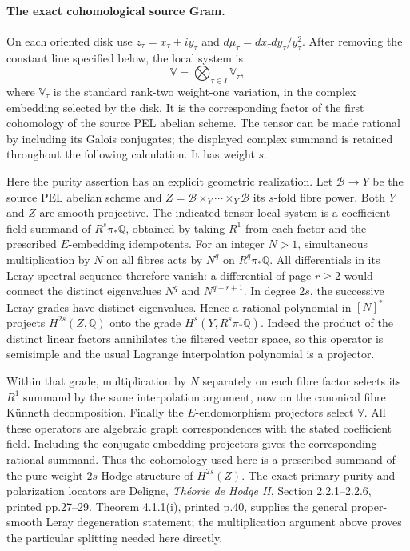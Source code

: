 \documentclass[11pt]{article}
\newcommand{\Q}{\mathbb Q}\newcommand{\C}{\mathbb C}\newcommand{\Z}{\mathbb Z}\newcommand{\R}{\mathbb R}\newcommand{\A}{\mathbb A}\newcommand{\OO}{\mathcal O}
\theoremstyle{definition}\newtheorem{definition}[theorem]{Definition}\newtheorem{remark}[theorem]{Remark}
\begin{document}
\paragraph{The exact cohomological source Gram.}
On each oriented disk use $z_\tau=x_\tau+iy_\tau$ and
$d\mu_\tau=dx_\tau dy_\tau/y_\tau^2$.  After removing the
constant line specified below, the local system is
\[
                     \mathbb V=
               \bigotimes_{\tau\in I}\mathbb V_\tau,
 \tag{B26i}
\]
where $\mathbb V_\tau$ is the standard rank-two weight-one
variation, in the complex embedding selected by the disk.
It is the corresponding factor of the first cohomology of
the source PEL abelian scheme.  The tensor can be made rational
by including its Galois conjugates; the displayed complex
summand is retained throughout the following calculation.
It has weight $s$.

Here the purity assertion has an explicit geometric
realization.  Let $\mathcal B\to Y$ be the source PEL
abelian scheme and $Z=\mathcal B\times_Y\cdots\times_Y
\mathcal B$ its $s$-fold fibre power.  Both $Y$ and $Z$
are smooth projective.  The indicated tensor local
system is a coefficient-field summand of
$R^s\pi_*\Q$, obtained by taking $R^1$ from each
factor and the prescribed $E$-embedding idempotents.
For an integer $N>1$, simultaneous multiplication
by $N$ on all fibres acts by $N^q$ on $R^q\pi_*\Q$.
All differentials in its Leray spectral sequence
therefore vanish: a differential of page $r\ge2$
would connect the distinct eigenvalues $N^q$ and
$N^{q-r+1}$.  In degree $2s$, the successive Leray
grades have distinct eigenvalues.  Hence a rational
polynomial in $[N]^*$ projects $H^{2s}(Z,\Q)$ onto
the grade $H^s(Y,R^s\pi_*\Q)$.  Indeed the product
of the distinct linear factors annihilates the
filtered vector space, so this operator is
semisimple and the usual Lagrange interpolation
polynomial is a projector.

Within that grade, multiplication by $N$ separately
on each fibre factor selects its $R^1$ summand by
the same interpolation argument, now on the
canonical fibre K\"unneth decomposition.  Finally
the $E$-endomorphism projectors select $\mathbb V$.
All these operators are algebraic graph
correspondences with the stated coefficient field.
Including the conjugate embedding projectors gives
the corresponding rational summand.  Thus the
cohomology used here is a prescribed summand of the
pure weight-$2s$ Hodge structure of $H^{2s}(Z)$.
The exact primary purity and polarization locators
are Deligne, \emph{Th\'eorie de Hodge II},
Section 2.2.1--2.2.6, printed pp.27--29.
Theorem 4.1.1(i), printed p.40, supplies the general
proper-smooth Leray degeneration statement; the
multiplication argument above proves the particular
splitting needed here directly.
\end{document}
